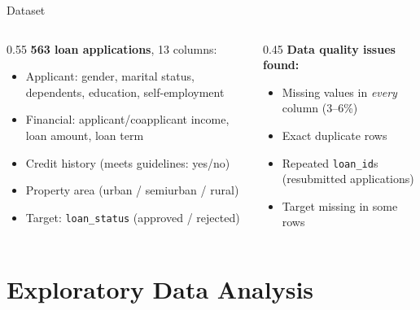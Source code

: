 \documentclass[aspectratio=169]{beamer}
\begin{document}
\begin{frame}{Dataset}
    \begin{columns}
        \begin{column}{0.55\textwidth}
            \textbf{563 loan applications}, 13 columns:
            \begin{itemize}
                \item Applicant: gender, marital status, dependents, education, self-employment
                \item Financial: applicant/coapplicant income, loan amount, loan term
                \item Credit history (meets guidelines: yes/no)
                \item Property area (urban / semiurban / rural)
                \item Target: \texttt{loan\_status} (approved / rejected)
            \end{itemize}
        \end{column}
        \begin{column}{0.45\textwidth}
            \textbf{Data quality issues found:}
            \begin{itemize}
                \item Missing values in \emph{every} column (3--6\%)
                \item Exact duplicate rows
                \item Repeated \texttt{loan\_id}s (resubmitted applications)
                \item Target missing in some rows
            \end{itemize}
        \end{column}
    \end{columns}
\end{frame}

\section{Exploratory Data Analysis}
\end{document}
